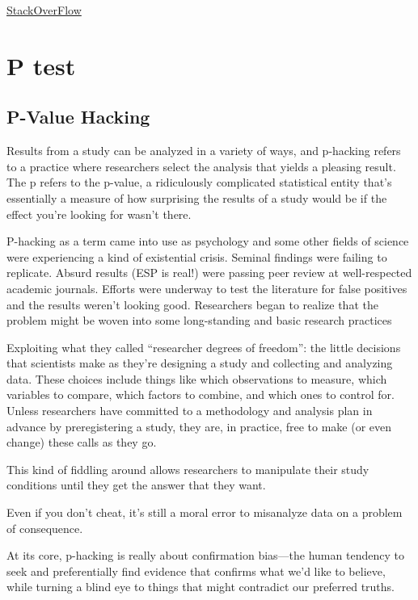 \documentclass[
]{book}
\begin{document}
\href{https://stats.stackexchange.com/questions/8661/logistic-regression-in-r-odds-ratio}{StackOverFlow}

\hypertarget{p-test}{%
\chapter{P test}\label{p-test}}

\hypertarget{p-value-hacking}{%
\section{P-Value Hacking}\label{p-value-hacking}}

Results from a study can be analyzed in a variety of ways, and p-hacking refers to a practice where researchers select the analysis that yields a pleasing result. The p refers to the p-value, a ridiculously complicated statistical entity that's essentially a measure of how surprising the results of a study would be if the effect you're looking for wasn't there.

P-hacking as a term came into use as psychology and some other fields of science were experiencing a kind of existential crisis. Seminal findings were failing to replicate. Absurd results (ESP is real!) were passing peer review at well-respected academic journals. Efforts were underway to test the literature for false positives and the results weren't looking good. Researchers began to realize that the problem might be woven into some long-standing and basic research practices

Exploiting what they called ``researcher degrees of freedom'': the little decisions that scientists make as they're designing a study and collecting and analyzing data. These choices include things like which observations to measure, which variables to compare, which factors to combine, and which ones to control for. Unless researchers have committed to a methodology and analysis plan in advance by preregistering a study, they are, in practice, free to make (or even change) these calls as they go.

This kind of fiddling around allows researchers to manipulate their study conditions until they get the answer that they want.

Even if you don't cheat, it's still a moral error to misanalyze data on a problem of consequence.

At its core, p-hacking is really about confirmation bias---the human tendency to seek and preferentially find evidence that confirms what we'd like to believe, while turning a blind eye to things that might contradict our preferred truths.
\end{document}
